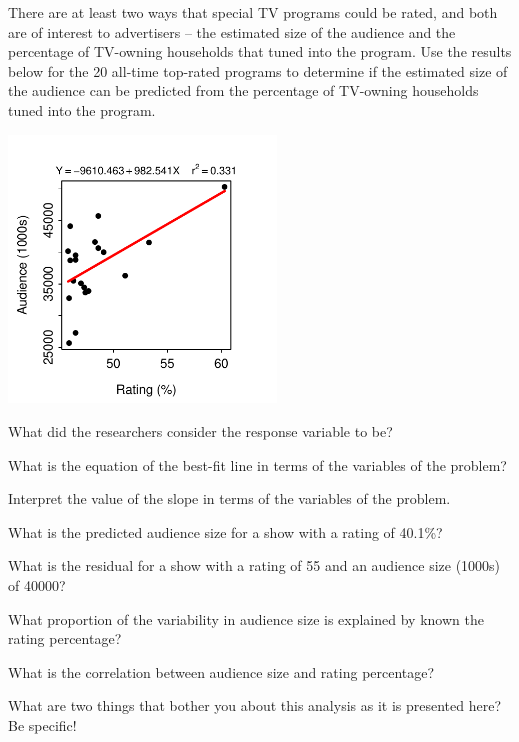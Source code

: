 \documentclass[10pt,openany]{book}\usepackage[]{graphicx}\usepackage[]{color}
\begin{document}
\begin{exsection}
  \item \label{revex:RegTVRate} There are at least two ways that special TV programs could be rated, and both are of interest to advertisers -- the estimated size of the audience and the percentage of TV-owning households that tuned into the program.  Use the results below for the 20 all-time top-rated programs to determine if the estimated size of the audience can be predicted from the percentage of TV-owning households tuned into the program.  

\begin{center}
  \includegraphics[width=2.8in]{Figs/TVFLP-1}
\end{center}
    \begin{Enumerate}
      \item What did the researchers consider the response variable to be?
      \item What is the equation of the best-fit line in terms of the variables of the problem?
      \item Interpret the value of the slope in terms of the variables of the problem.
      \item What is the predicted audience size for a show with a rating of 40.1\%?
      \item What is the residual for a show with a rating of 55 and an audience size (1000s) of 40000?
      \item What proportion of the variability in audience size is explained by known the rating percentage?
      \item What is the correlation between audience size and rating percentage?
      \item What are two things that bother you about this analysis as it is presented here? Be specific!
    \end{Enumerate}


\end{exsection}
\end{document}
